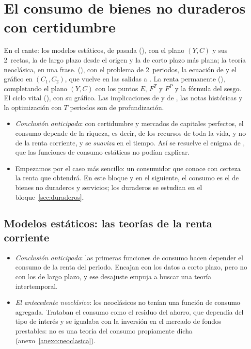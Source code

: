 \documentclass[11pt]{article}
\begin{document}
\section{El consumo de bienes no duraderos\cortetitulo{} con certidumbre}\label{sec:certidumbre}

\begin{notaopositor}
En el cante: los modelos estáticos, de pasada (), con el plano $(Y,C)$ y sus 2~rectas, la de largo plazo desde el origen y la de corto plazo más plana; la teoría neoclásica, en una frase.  (), con el problema de 2~periodos, la ecuación de  y el gráfico en $(C_1,C_2)$, que vuelve en las salidas a . La renta permanente (), completando el plano $(Y,C)$ con los puntos $E$, $F^T$ y $F^P$ y la fórmula del sesgo. El ciclo vital (), con su gráfico. Las implicaciones de  y de , las notas históricas y la optimización con $T$ periodos son de profundización.
\end{notaopositor}

\begin{itemize}
\item \emph{Conclusión anticipada}: con certidumbre y mercados de capitales perfectos, el consumo depende de la riqueza, es decir, de los recursos de toda la vida, y no de la renta corriente, y se \emph{suaviza} en el tiempo. Así se resuelve el enigma de , que las funciones de consumo estáticas no podían explicar.
\item Empezamos por el caso más sencillo: un consumidor que conoce con certeza la renta que obtendrá. En este bloque y en el siguiente, el consumo es el de bienes no duraderos y servicios; los duraderos se estudian en el bloque~\ref{sec:duraderos}.
\end{itemize}

\subsection{Modelos estáticos: las teorías de la renta corriente}\label{sec:estaticos}

\begin{itemize}
\item \emph{Conclusión anticipada}: las primeras funciones de consumo hacen depender el consumo de la renta del periodo. Encajan con los datos a corto plazo, pero no con los de largo plazo, y ese desajuste empuja a buscar una teoría intertemporal.
\item \emph{El antecedente neoclásico}: los neoclásicos no tenían una función de consumo agregada. Trataban el consumo como el residuo del ahorro, que dependía del tipo de interés y se igualaba con la inversión en el mercado de fondos prestables: no es una teoría del consumo propiamente dicha (anexo~\ref{anexo:neoclasica}).
\end{itemize}
\end{document}
